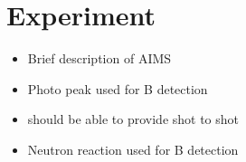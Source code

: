 \documentclass[final,3p,times,twocolumn]{elsarticle}
\begin{document}



  

\section{Experiment}
\begin{itemize}
	\item Brief description of AIMS
	\item Photo peak used for B detection
	\item should be able to provide shot to shot 
	\item Neutron reaction used for B detection
\end{itemize}
\end{document}
